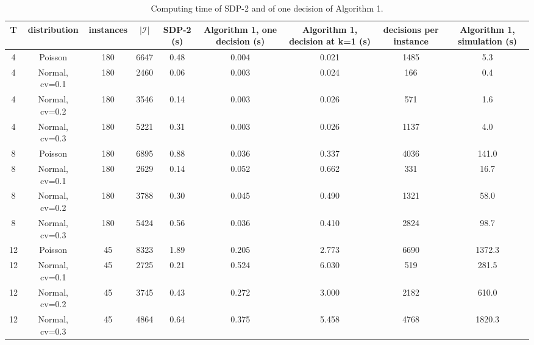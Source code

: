 \begin{table}[H]
\centering
\caption{Computing time of SDP-2 and of one decision of Algorithm 1.}
\label{tab:test2_Q2_time}
\begin{tabular}{ccccccccc}
\toprule
T & distribution & instances & $|\mathcal{I}|$ & SDP-2 (s) & Algorithm 1, one decision (s) & Algorithm 1, decision at k=1 (s) & decisions per instance & Algorithm 1, simulation (s) \\
\midrule
4 & Poisson & 180 & 6647 & 0.48 & 0.004 & 0.021 & 1485 & 5.3 \\
4 & Normal, cv=0.1 & 180 & 2460 & 0.06 & 0.003 & 0.024 & 166 & 0.4 \\
4 & Normal, cv=0.2 & 180 & 3546 & 0.14 & 0.003 & 0.026 & 571 & 1.6 \\
4 & Normal, cv=0.3 & 180 & 5221 & 0.31 & 0.003 & 0.026 & 1137 & 4.0 \\
8 & Poisson & 180 & 6895 & 0.88 & 0.036 & 0.337 & 4036 & 141.0 \\
8 & Normal, cv=0.1 & 180 & 2629 & 0.14 & 0.052 & 0.662 & 331 & 16.7 \\
8 & Normal, cv=0.2 & 180 & 3788 & 0.30 & 0.045 & 0.490 & 1321 & 58.0 \\
8 & Normal, cv=0.3 & 180 & 5424 & 0.56 & 0.036 & 0.410 & 2824 & 98.7 \\
12 & Poisson & 45 & 8323 & 1.89 & 0.205 & 2.773 & 6690 & 1372.3 \\
12 & Normal, cv=0.1 & 45 & 2725 & 0.21 & 0.524 & 6.030 & 519 & 281.5 \\
12 & Normal, cv=0.2 & 45 & 3745 & 0.43 & 0.272 & 3.000 & 2182 & 610.0 \\
12 & Normal, cv=0.3 & 45 & 4864 & 0.64 & 0.375 & 5.458 & 4768 & 1820.3 \\
\bottomrule
\end{tabular}
\end{table}